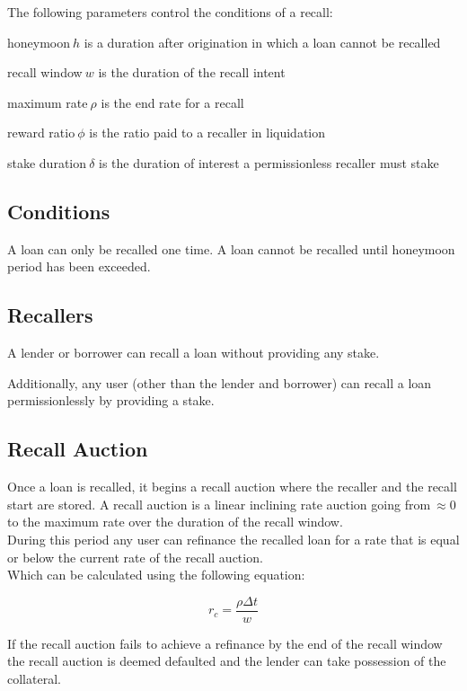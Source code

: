 \documentclass[12pt]{article}
\begin{document}
The following parameters control the conditions of a recall:
\itemize
\item honeymoon$\ h$ is a duration after origination in which a loan cannot be recalled
\item recall window$\ w$ is the duration of the recall intent
\item maximum rate$\ \rho$ is the end rate for a recall
\item reward ratio$\ \phi$ is the ratio paid to a recaller in liquidation
\item stake duration$\ \delta$ is the duration of interest a permissionless recaller must stake

\subsection{Conditions}
A loan can only be recalled one time. A loan cannot be recalled until honeymoon period has been exceeded.

\subsection{Recallers}
A lender or borrower can recall a loan without providing any stake.

Additionally, any user (other than the lender and borrower) can recall a loan permissionlessly by providing a stake.

\subsection{Recall Auction}

Once a loan is recalled, it begins a recall auction where the recaller and the recall start are stored. A recall auction is a linear inclining rate auction going from$\ \approx0$ to the maximum rate over the duration of the recall window.\\

During this period any user can refinance the recalled loan for a rate that is equal or below the current rate of the recall auction.\\

Which can be calculated using the following equation:

$$
 r_c = \frac{\rho \Delta t}{w}
$$

If the recall auction fails to achieve a refinance by the end of the recall window the recall auction is deemed defaulted and the lender can take possession of the collateral.\\
\end{document}
